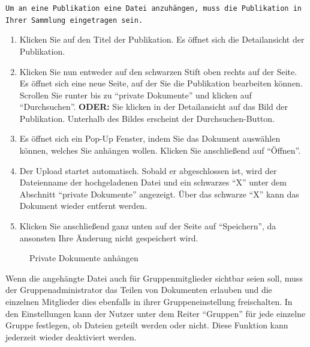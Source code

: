 \begin{mdframed}[style=mdfexample1,frametitle={\texttt{BEDINGUNG}},backgroundcolor=gray!40]\texttt{Um an eine Publikation eine Datei anzuhängen, muss die Publikation in Ihrer Sammlung eingetragen sein.}\end{mdframed}
\begin{enumerate}
    \item Klicken Sie auf den Titel der Publikation. Es öffnet sich die Detailansicht der Publikation.
    \item Klicken Sie nun entweder auf den schwarzen Stift oben rechts auf der Seite. Es öffnet sich eine neue Seite, auf der Sie die Publikation bearbeiten können. Scrollen Sie runter bis zu \enquote{private Dokumente} und klicken auf \enquote{Durchsuchen}. \newline \textbf{ODER:} Sie klicken in der Detailansicht auf das Bild der Publikation. Unterhalb des Bildes erscheint der Durchsuchen-Button. 
    \item Es öffnet sich ein Pop-Up Fenster, indem Sie das Dokument auswählen können, welches Sie anhängen wollen. Klicken Sie anschließend auf \enquote{Öffnen}.
    \item Der Upload startet automatisch. Sobald er abgeschlossen ist, wird der Dateienname der hochgeladenen Datei und ein schwarzes \enquote{X} unter dem Abschnitt \enquote{private Dokumente} angezeigt. Über das schwarze \enquote{X} kann das Dokument wieder entfernt werden.
    \item Klicken Sie anschließend ganz unten auf der Seite auf \enquote{Speichern}, da ansonsten Ihre Änderung nicht gespeichert wird.
\end{enumerate}
\begin{figure}[h!]
 \centering
 \caption{Private Dokumente anhängen}
 \label{figure028}
\end{figure}
Wenn die angehängte Datei auch für Gruppenmitglieder sichtbar seien soll, muss der  Gruppenadministrator das Teilen von Dokumenten erlauben
und die einzelnen Mitglieder dies ebenfalls in ihrer Gruppeneinstellung freischalten. In den Einstellungen kann der Nutzer unter dem Reiter \enquote{Gruppen} für jede einzelne Gruppe festlegen, ob Dateien geteilt werden oder nicht. Diese Funktion kann jederzeit wieder deaktiviert werden.
